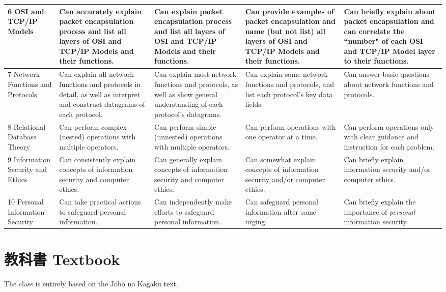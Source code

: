\documentclass[a4paper]{article}
\begin{document}
\begin{landscape}
\begin{longtable}{|p{3.0cm}|p{4cm}|p{4cm}|p{4cm}|p{4cm}|}
\\
\hline
6 OSI and TCP/IP Models &
  Can accurately explain packet encapsulation process and list all layers of OSI and TCP/IP Models and their functions. &
  Can explain packet encapsulation process and list all layers of OSI and TCP/IP Models and their functions. &
  Can provide examples of packet encapsulation and name (but not list) all layers of OSI and TCP/IP Models and their functions. &
  Can briefly explain about packet encapsulation and can correlate the ``number" of each OSI and TCP/IP Model layer to their functions.
\\
\hline
7 Network Functions and Protocols &
  Can explain all network functions and protocols in detail, as well as interpret and construct datagrams of each protocol. &
  Can explain most network functions and protocols, as well as show general understanding of each protocol's datagrams. &
  Can explain some network functions and protocols, and list each protocol's key data fields. &
  Can answer basic questions about network functions and protocols.
\\
\hline
8 Relational Database Theory &
  Can perform complex (nested) operations with multiple operators. &
  Can perform simple (unnested) operations with multiple operators. &
  Can perform operations with one operator at a time. &
  Can perform operations only with clear guidance and instruction for each problem.
\\
\hline
9 Information Security and Ethics &
  Can consistently explain concepts of information security and computer ethics. &
  Can generally explain concepts of information security and computer ethics. &
  Can somewhat explain concepts of information security and/or computer ethics. &
  Can briefly explain information security and/or computer ethics.
\\
\hline
10 Personal Information Security &
  Can take practical actions to safeguard personal information. &
  Can independently make efforts to safeguard personal information. &
  Can safeguard personal information after some urging. &
  Can briefly explain the importance of \textit{personal} information security.
\\
\hline

\end{longtable}

\end{landscape}

\section{教科書 Textbook}
The class is entirely based on the J\={o}h\={o} no Kagaku text. 
\end{document}
